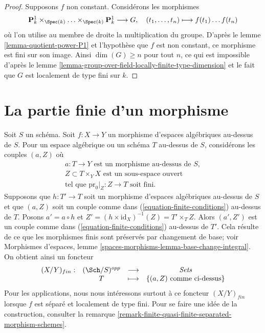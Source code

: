 \begin{proof}
Supposons $f$ non constant. Considérons les morphismes
$$
\mathbf{P}^1_k \times_{\Spec(k)} \ldots \times_{\Spec(k)} \mathbf{P}^1_k
\longrightarrow G,
\quad (t_1, \ldots, t_n) \longmapsto f(t_1) \ldots f(t_n)
$$
où l'on utilise au membre de droite la multiplication du groupe.
D'après le lemme \ref{lemma-quotient-power-P1} et l'hypothèse que $f$
est non constant, ce morphisme est fini sur son image.
Ainsi $\dim(G) \geq n$ pour tout $n$, ce qui est impossible d'après le
lemme \ref{lemma-group-over-field-locally-finite-type-dimension}
et le fait que $G$ est localement de type fini sur $k$.
\end{proof}




\section{La partie finie d'un morphisme}
\label{section-finite}

\noindent
Soit $S$ un schéma.
Soit $f : X \to Y$ un morphisme d'espaces algébriques au-dessus de $S$.
Pour un espace algébrique ou un schéma $T$ au-dessus de $S$, considérons les couples
$(a, Z)$ où
\begin{equation}
\label{equation-finite-conditions}
\begin{matrix}
a : T \to Y\text{ est un morphisme au-dessus de }S, \\
Z \subset T \times_Y X\text{ est un sous-espace ouvert} \\
\text{tel que }\text{pr}_0|_Z : Z \to T\text{ soit fini.}
\end{matrix}
\end{equation}
Supposons que $h : T' \to T$ soit un morphisme d'espaces algébriques au-dessus de $S$
et que $(a, Z)$ soit un couple comme dans (\ref{equation-finite-conditions}) au-dessus de $T$. Posons
$a' = a \circ h$ et $Z' = (h \times \text{id}_X)^{-1}(Z) = T' \times_T Z$.
Alors $(a', Z')$ est un couple comme dans (\ref{equation-finite-conditions}) au-dessus de $T'$.
Cela résulte de ce que les morphismes finis sont préservés par changement de base; voir
Morphismes d'espaces, lemme \ref{spaces-morphisms-lemma-base-change-integral}.
On obtient ainsi un foncteur
\begin{equation}
\label{equation-finite}
\begin{matrix}
(X/Y)_{fin} : &
(\Sch/S)^{opp} &
\longrightarrow &
\textit{Sets} \\
& T & \longmapsto &
\{(a, Z)\text{ comme ci-dessus}\}
\end{matrix}
\end{equation}
Pour les applications, nous nous intéressons surtout à ce foncteur $(X/Y)_{fin}$
lorsque $f$ est séparé et localement de type fini. Pour se faire une idée
de la construction, consulter la
remarque \ref{remark-finite-quasi-finite-separated-morphism-schemes}.


